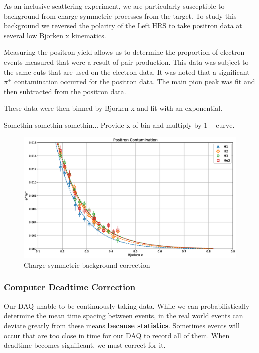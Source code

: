 As an inclusive scattering experiment, we are particularly susceptible to background from charge symmetric processes from the target. To study this background we reversed the polarity of the Left HRS to take positron data at several low Bjorken x kinematics.

Measuring the positron yield allows us to determine the proportion of electron events measured that were a result of pair production. This data was subject to the same cuts that are used on the electron data. It was noted that a significant $\pi^+$ contamination occurred for the positron data. The main pion peak was fit and then subtracted from the positron data.

These data were then binned by Bjorken x and fit with an exponential. 

Somethin somethin somethin... Provide x of bin and multiply by $1-\mathrm{curve}$.

\begin{figure}
	\includegraphics[width=\textwidth]{./chap3-analysis/fig/positrons.eps}
	\caption{Charge symmetric background correction}
	\label{fig:positrons}
\end{figure}

\subsubsection{Computer Deadtime Correction}

Our DAQ unable to be continuously taking data. While we can probabilistically determine the mean time spacing between events, in the real world events can deviate greatly from these means \textbf{because statistics}. Sometimes events will occur that are too close in time for our DAQ to record all of them. When deadtime becomes significant, we must correct for it.

